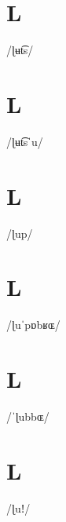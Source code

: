 \documentclass[10pt,a4paper,twoside]{book}
\begin{document}
\section*{L}

\begin{multicols}{3}
 {/ɭʉt͡s/} {}
\end{multicols}

\section*{L}

\begin{multicols}{3}
 {/ɭʉt͡sˈu/} {}
\end{multicols}

\section*{L}

\begin{multicols}{3}
 {/ɭup/} {}
\end{multicols}

\section*{L}

\begin{multicols}{3}
 {/ɭuˈpɒbʁɶ/} {}
\end{multicols}

\section*{L}

\begin{multicols}{3}
 {/ˈɭubbɶ/} {}
\end{multicols}

\section*{L}

\begin{multicols}{3}
 {/ɭuǃ/} {}
\end{multicols}
\end{document}
